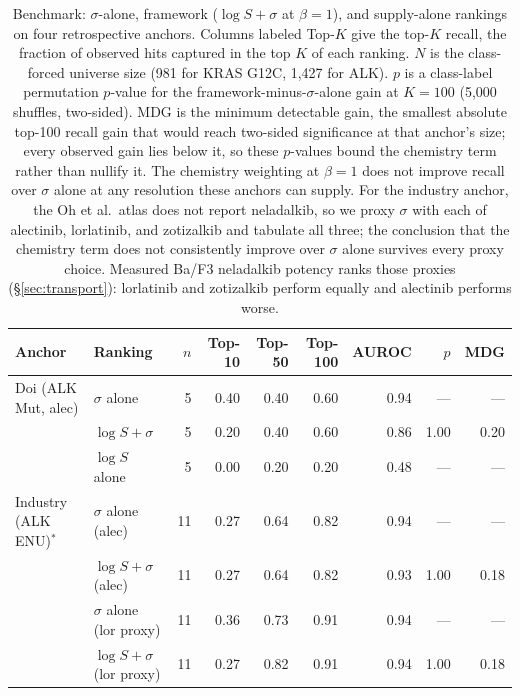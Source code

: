 \documentclass[11pt,a4paper]{article}
\begin{document}
\begin{table}[htbp]
\centering
\caption{Benchmark: $\sigma$-alone, framework ($\log S + \sigma$ at
$\beta=1$), and supply-alone rankings on four retrospective anchors.
Columns labeled Top-$K$ give the top-$K$ recall, the fraction of
observed hits captured in the top $K$ of each ranking.
$N$ is the class-forced universe size (981 for KRAS
G12C, 1,427 for ALK). $p$ is a class-label permutation $p$-value for the
framework-minus-$\sigma$-alone gain at $K=100$ (5,000 shuffles,
two-sided). MDG is the minimum detectable gain, the smallest absolute
top-100 recall gain that would reach two-sided significance at that
anchor's size; every observed gain lies below it, so these $p$-values
bound the chemistry term rather than nullify it. The chemistry
weighting at $\beta = 1$ does not improve recall over $\sigma$ alone
at any resolution these anchors can supply. For the industry anchor,
the Oh et al.\ atlas does not report
neladalkib, so we proxy $\sigma$ with each of alectinib, lorlatinib, and
zotizalkib and tabulate all three; the conclusion that the chemistry
term does not consistently improve over $\sigma$ alone survives every
proxy choice. Measured Ba/F3 neladalkib potency ranks those proxies
(\S\ref{sec:transport}): lorlatinib and zotizalkib perform equally and
alectinib performs worse.}
\label{tab:benchmark}
\scriptsize
\setlength{\tabcolsep}{3pt}
\begin{tabular*}{\textwidth}{@{\extracolsep{\fill}}llrrrrrrr@{}}
\toprule
\textbf{Anchor} & \textbf{Ranking} & $n$ & \textbf{Top-10} & \textbf{Top-50} & \textbf{Top-100} & \textbf{AUROC} & $p$ & \textbf{MDG} \\
\midrule
Doi (ALK Mut, alec)     & $\sigma$ alone                  & 5  & 0.40 & 0.40 & 0.60 & 0.94 & --- & --- \\
                        & $\log S + \sigma$               & 5  & 0.20 & 0.40 & 0.60 & 0.86 & 1.00 & 0.20 \\
                        & $\log S$ alone                  & 5  & 0.00 & 0.20 & 0.20 & 0.48 & --- & --- \\
\midrule
Industry (ALK ENU)$^\ast$& $\sigma$ alone (alec)           & 11 & 0.27 & 0.64 & 0.82 & 0.94 & --- & --- \\
                        & $\log S + \sigma$ (alec)        & 11 & 0.27 & 0.64 & 0.82 & 0.93 & 1.00 & 0.18 \\
                        & $\sigma$ alone (lor proxy)      & 11 & 0.36 & 0.73 & 0.91 & 0.94 & --- & --- \\
                        & $\log S + \sigma$ (lor proxy)   & 11 & 0.27 & 0.82 & 0.91 & 0.94 & 1.00 & 0.18 \\

\end{tabular*}
\end{table}
\end{document}
